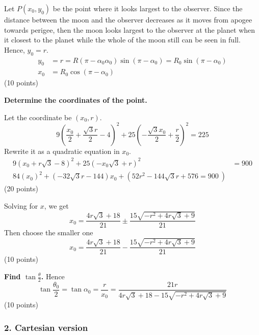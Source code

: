 \begin{description}
  Let $P(x_0, y_0)$ be the point where it looks largest to the observer. Since
  the distance between the moon and the observer decreases as it moves from
  apogee towards perigee, then the moon looks largest to the observer at the
  planet when it closest to the planet while the whole of the moon still can %
  be seen in full. Hence, $y_0 = r$.
  \begin{align*}
    y_0 &= r = R(\pi - \alpha_0\alpha_0)\sin(\pi - \alpha_0)
      = R_0\sin(\pi - \alpha_0) \\ %
    x_0 &= R_0\cos(\pi - \alpha_0)
  \end{align*}
  \hfill(10 points)


  \textbf{Determine the coordinates of the point.}

  Let the coordinate be $(x_0, r)$.
  \[
    9\left(\frac{x_0}{2} + \frac{\sqrt{3}r}{2} - 4\right)^2
      + 25\left(-\frac{\sqrt{3}x_0}{2} + \frac{r}{2}\right)^2 = 225
  \]
  Rewrite it as a quadratic equation in $x_0$.
  \begin{align*}
    9\left(x_0 + r\sqrt{3} - 8\right)^2
      + 25\left(-x_0\sqrt{3} + r\right)^2 &= 900 \\
    84(x_0)^2 + \left(-32\sqrt{3}r - 144\right)x_0
      + \left(52r^2 - 144\sqrt{3}r + 576 = 900\ \right) %
  \end{align*}
  \hfill(20 points)

  Solving for $x$, we get
  \[
    x_0 = \frac{4r\sqrt{3} + 18}{21}
      \pm \frac{15\sqrt{-r^2 + 4r\sqrt{3} + 9}}{21}
  \]
  Then choose the smaller one
  \[
    x_0 = \frac{4r\sqrt{3} + 18}{21}
      - \frac{15\sqrt{-r^2 + 4r\sqrt{3} + 9}}{21}
  \]
  \hfill(10 points)

  \textbf{Find $\tan\frac{\theta}{2}$.} Hence
  \[
    \tan\frac{\theta_0}{2} = \tan\alpha_0 = \frac{r}{x_0}
      = \frac{21r}{4r\sqrt{3} + 18 - 15\sqrt{-r^2 + 4r\sqrt{3} + 9}}
  \]
  \hfill(10 points)
\end{description}

\subsubsection*{2. Cartesian version}

